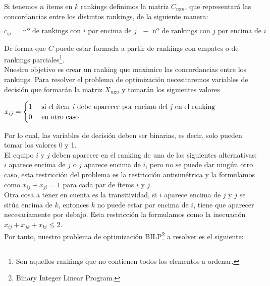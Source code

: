 Si tenemos $n$ ítems en $k$ rankings definimos la matriz $C_{n \text{x} n}$, que representará las concordancias entre los distintos rankings, de la siguiente manera:
\begin{center}
	$c_{ij} = \text{ nº de rankings con }i \text{ por encima de } j \text{ } -  \text{ nº de rankings con }j \text{ por encima de } i \text{ }$
\end{center}

De forma que $C$ puede estar formada a partir de rankings con empates o de rankings parciales\footnote{Son aquellos rankings que no contienen todos los elementos a ordenar.}.\\

Nuestro objetivo es crear un ranking que maximice las concordancias entre los rankings. 
Para resolver el problema de optimización necesitaremos variables de decisión que formarán la matriz $X_{n \text{x} n}$ y tomarán los siguientes valores
\begin{center}
	$ x_{ij} =  \begin{cases}
1 & \text{ si el ítem \textit{i} debe aparecer por encima del \textit{j} en el ranking} \\
0 & \text{ en otro caso } 
\end{cases}$
\end{center}
Por lo cual, las variables de decisión deben ser binarias, es decir, solo pueden tomar los valores 0 y 1.\\

El equipo $i$ y $j$ deben aparecer en el ranking de una de las siguientes alternativas: $i$ aparece encima de $j$ o $j$ aparece encima de $i$, pero no se puede dar ningún otro caso, esta restricción del problema es la restricción antisimétrica y la formulamos como $x_{ij} + x_{ji} = 1$ para cada par de ítems $i$ y $j$.\\

Otra cosa a tener en cuenta es la transitividad, si $i$ aparece encima de $j$ y $j$ se sitúa encima de $k$, entonces $k$ no puede estar por encima de $i$, tiene que aparecer necesariamente por debajo. Esta restricción la formulamos como la inecuación $x_{ij} + x_{jk} + x_{ki} \leq 2$.\\


Por tanto, nuestro problema de optimización BILP\footnote{Binary Integer Linear Program.} a resolver es el siguiente:\\

